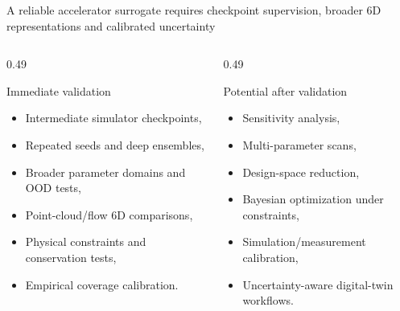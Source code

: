 \begin{frame}[t,shrink=5]{A reliable accelerator surrogate requires checkpoint supervision, broader 6D representations and calibrated uncertainty}
\begin{columns}[T,onlytextwidth]
\begin{column}{0.49\textwidth}
\begin{block}{Immediate validation}
\begin{itemize}
\item Intermediate simulator checkpoints,
\item Repeated seeds and deep ensembles,
\item Broader parameter domains and OOD tests,
\item Point-cloud/flow 6D comparisons,
\item Physical constraints and conservation tests,
\item Empirical coverage calibration.
\end{itemize}
\end{block}

\end{column}
\begin{column}{0.49\textwidth}
\begin{block}{Potential after validation}
\begin{itemize}
\item Sensitivity analysis,
\item Multi-parameter scans,
\item Design-space reduction,
\item Bayesian optimization under constraints,
\item Simulation/measurement calibration,
\item Uncertainty-aware digital-twin workflows.
\end{itemize}
\end{block}

\end{column}
\end{columns}


\end{frame}

